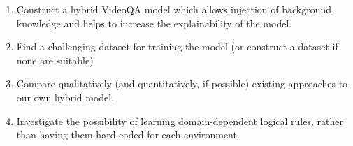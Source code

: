 \documentclass[../interim.tex]{subfiles}
\begin{document}
\begin{enumerate}
  \item Construct a hybrid VideoQA model which allows injection of background knowledge and helps to increase the explainability of the model.

  \item Find a challenging dataset for training the model (or construct a dataset if none are suitable)

  \item Compare qualitatively (and quantitatively, if possible) existing approaches to our own hybrid model.

  \item Investigate the possibility of learning domain-dependent logical rules, rather than having them hard coded for each environment.
\end{enumerate}
\end{document}
